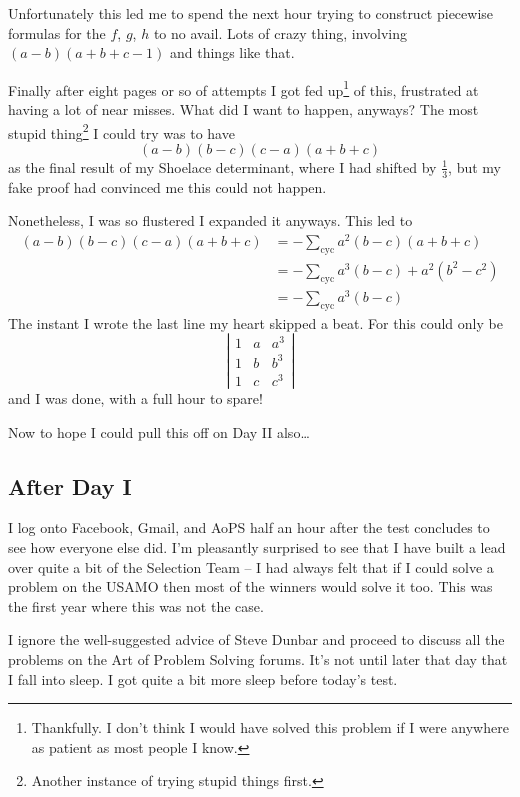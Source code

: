 \documentclass[11pt]{scrartcl}
\begin{document}
Unfortunately this led me to spend the next hour trying to construct piecewise formulas for the $f$, $g$, $h$ to no avail.
Lots of crazy thing, involving $(a-b)(a+b+c-1)$ and things like that.

Finally after eight pages or so of attempts I got fed up\footnote{Thankfully. I don't think I would have solved this problem if I were anywhere as patient as most people I know.} of this, frustrated at having a lot of near misses.
What did I want to happen, anyways? The most stupid thing\footnote{Another instance of trying stupid things first.} I could try was to have
\[ (a-b)(b-c)(c-a)(a+b+c) \]
as the final result of my Shoelace determinant, where I had shifted by $\tfrac 13$, but my fake proof had convinced me this could not happen.

Nonetheless, I was so flustered I expanded it anyways. This led to
\begin{align*}
  (a-b)(b-c)(c-a)(a+b+c) &= -\sum_{\text{cyc}} a^2(b-c)(a+b+c) \\
  &= -\sum_{\text{cyc}} a^3(b-c) + a^2(b^2-c^2) \\
  &= -\sum_{\text{cyc}} a^3(b-c)
\end{align*}
The instant I wrote  the last line my heart skipped a beat. For this could only be
\[ \left\lvert
  \begin{array}{ccc}
    1 & a & a^3 \\
    1 & b & b^3 \\
    1 & c & c^3
  \end{array}
  \right\rvert \]
and I was done, with a full hour to spare!

Now to hope I could pull this off on Day II also\dots

\subsection{After Day I}
I log onto Facebook, Gmail, and AoPS half an hour after the test concludes to see how everyone else did.
I'm pleasantly surprised to see that I have built a lead over quite a bit of the Selection Team -- I had always felt that if I could solve a problem on the USAMO then most of the winners would solve it too. This was the first year where this was not the case.

I ignore the well-suggested advice of Steve Dunbar and proceed to discuss all the problems on the Art of Problem Solving forums. It's not until later that day that I fall into sleep.
I got quite a bit more sleep before today's test.
\end{document}
